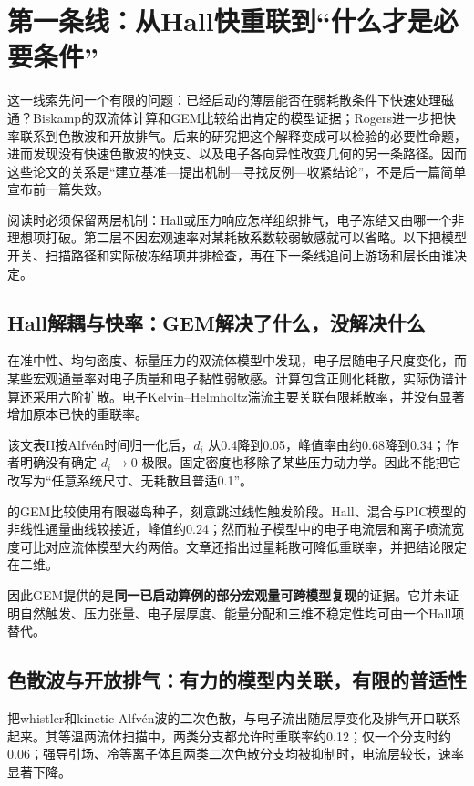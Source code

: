 \section{第一条线：从Hall快重联到“什么才是必要条件”}\label{story:fast}
这一线索先问一个有限的问题：已经启动的薄层能否在弱耗散条件下快速处理磁通？Biskamp的双流体计算和GEM比较给出肯定的模型证据；Rogers进一步把快率联系到色散波和开放排气。后来的研究把这个解释变成可以检验的必要性命题，进而发现没有快速色散波的快支、以及电子各向异性改变几何的另一条路径。因而这些论文的关系是“建立基准—提出机制—寻找反例—收紧结论”，不是后一篇简单宣布前一篇失效。

阅读时必须保留两层机制：Hall或压力响应怎样组织排气，电子冻结又由哪一个非理想项打破。第二层不因宏观速率对某耗散系数较弱敏感就可以省略。以下把模型开关、扫描路径和实际破冻结项并排检查，再在下一条线追问上游场和层长由谁决定。

\subsection{Hall解耦与快率：GEM解决了什么，没解决什么}
\citet{Biskamp1997}在准中性、均匀密度、标量压力的双流体模型中发现，电子层随电子尺度变化，而某些宏观通量率对电子质量和电子黏性弱敏感。计算包含正则化耗散，实际伪谱计算还采用六阶扩散。电子Kelvin--Helmholtz湍流主要关联有限耗散率，并没有显著增加原本已快的重联率。

该文表II按Alfvén时间归一化后，$d_i$ 从0.4降到0.05，峰值率由约0.68降到0.34；作者明确没有确定 $d_i\to0$ 极限。固定密度也移除了某些压力动力学。因此不能把它改写为“任意系统尺寸、无耗散且普适0.1”。

\citet{Birn2001}的GEM比较使用有限磁岛种子，刻意跳过线性触发阶段。Hall、混合与PIC模型的非线性通量曲线较接近，峰值约0.24；然而粒子模型中的电子电流层和离子喷流宽度可比对应流体模型大约两倍。文章还指出过量耗散可降低重联率，并把结论限定在二维。

因此GEM提供的是\textbf{同一已启动算例的部分宏观量可跨模型复现}的证据。它并未证明自然触发、压力张量、电子层厚度、能量分配和三维不稳定性均可由一个Hall项替代。

\subsection{色散波与开放排气：有力的模型内关联，有限的普适性}
\citet{Rogers2001}把whistler和kinetic Alfvén波的二次色散，与电子流出随层厚变化及排气开口联系起来。其等温两流体扫描中，两类分支都允许时重联率约0.12；仅一个分支时约0.06；强导引场、冷等离子体且两类二次色散分支均被抑制时，电流层较长，速率显著下降。


